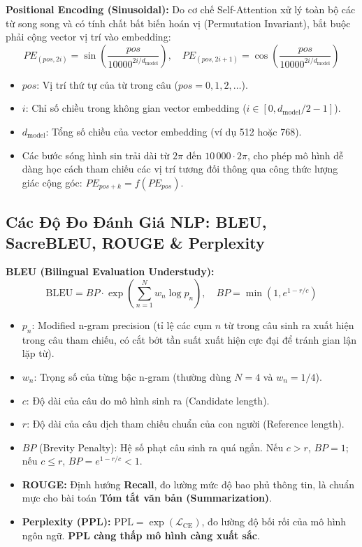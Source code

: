 \documentclass[10pt,a4paper]{article}
\begin{document}
\textbf{Positional Encoding (Sinusoidal):}
Do cơ chế Self-Attention xử lý toàn bộ các từ song song và có tính chất bất biến hoán vị (Permutation Invariant), bắt buộc phải cộng vector vị trí vào embedding:
\begin{equation}
    PE_{(pos, 2i)} = \sin\left( \frac{pos}{10000^{2i/d_{\text{model}}}} \right), \quad PE_{(pos, 2i+1)} = \cos\left( \frac{pos}{10000^{2i/d_{\text{model}}}} \right)
\end{equation}
\begin{itemize}[leftmargin=*]
    \item $pos$: Vị trí thứ tự của từ trong câu ($pos = 0, 1, 2, \dots$).
    \item $i$: Chỉ số chiều trong không gian vector embedding ($i \in [0, d_{\text{model}}/2 - 1]$).
    \item $d_{\text{model}}$: Tổng số chiều của vector embedding (ví dụ 512 hoặc 768).
    \item Các bước sóng hình sin trải dài từ $2\pi$ đến $10\,000 \cdot 2\pi$, cho phép mô hình dễ dàng học cách tham chiếu các vị trí tương đối thông qua công thức lượng giác cộng góc: $PE_{pos + k} = f(PE_{pos})$.
\end{itemize}

\subsection{Các Độ Đo Đánh Giá NLP: BLEU, SacreBLEU, ROUGE \& Perplexity}
\textbf{BLEU (Bilingual Evaluation Understudy):}
\begin{equation}
    \text{BLEU} = BP \cdot \exp\left( \sum_{n=1}^N w_n \log p_n \right), \quad BP = \min\left(1, e^{1 - r/c}\right)
\end{equation}
\begin{itemize}[leftmargin=*]
    \item $p_n$: Modified n-gram precision (tỉ lệ các cụm $n$ từ trong câu sinh ra xuất hiện trong câu tham chiếu, có cắt bớt tần suất xuất hiện cực đại để tránh gian lận lặp từ).
    \item $w_n$: Trọng số của từng bậc n-gram (thường dùng $N=4$ và $w_n = 1/4$).
    \item $c$: Độ dài của câu do mô hình sinh ra (Candidate length).
    \item $r$: Độ dài của câu dịch tham chiếu chuẩn của con người (Reference length).
    \item $BP$ (Brevity Penalty): Hệ số phạt câu sinh ra quá ngắn. Nếu $c > r$, $BP = 1$; nếu $c \le r$, $BP = e^{1 - r/c} < 1$.
    \item \textbf{ROUGE:} Định hướng \textbf{Recall}, đo lường mức độ bao phủ thông tin, là chuẩn mực cho bài toán \textbf{Tóm tắt văn bản (Summarization)}.
    \item \textbf{Perplexity (PPL):} $\text{PPL} = \exp(\mathcal{L}_{\text{CE}})$, đo lường độ bối rối của mô hình ngôn ngữ. \textbf{PPL càng thấp mô hình càng xuất sắc}.
\end{itemize}
\end{document}
